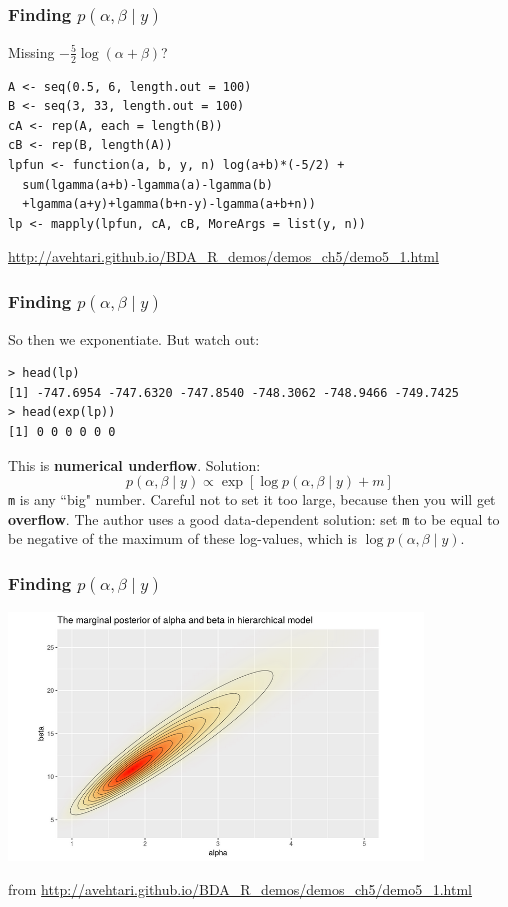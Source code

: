 \documentclass{beamer}
\begin{document}
\begin{frame}[fragile]
\frametitle{Finding $p(\alpha,\beta \mid y)$ }

Missing $- \frac{5}{2} \log (\alpha + \beta)$?
\begin{verbatim}
A <- seq(0.5, 6, length.out = 100)
B <- seq(3, 33, length.out = 100)
cA <- rep(A, each = length(B))
cB <- rep(B, length(A))
lpfun <- function(a, b, y, n) log(a+b)*(-5/2) +
  sum(lgamma(a+b)-lgamma(a)-lgamma(b)
  +lgamma(a+y)+lgamma(b+n-y)-lgamma(a+b+n))
lp <- mapply(lpfun, cA, cB, MoreArgs = list(y, n))
\end{verbatim}


\url{http://avehtari.github.io/BDA_R_demos/demos_ch5/demo5_1.html}

\end{frame}


\begin{frame}[fragile]
\frametitle{Finding $p(\alpha,\beta \mid y)$ }

So then we exponentiate. But watch out: 
\begin{verbatim}
> head(lp)
[1] -747.6954 -747.6320 -747.8540 -748.3062 -748.9466 -749.7425
> head(exp(lp))
[1] 0 0 0 0 0 0
\end{verbatim}
\pause

This is {\bf numerical underflow}. Solution:
\[
p(\alpha, \beta \mid y) \propto \exp[\log p(\alpha, \beta \mid y) + m]
\]
\verb|m| is any ``big" number. Careful not to set it too large, because then you will get {\bf overflow}. The author uses a good data-dependent solution: set \verb|m| to be equal to be negative of the maximum of these log-values, which is $\log p(\alpha, \beta \mid y)$. 

\end{frame}

\begin{frame}[fragile]
\frametitle{Finding $p(\alpha,\beta \mid y)$ }

\begin{center}
\includegraphics[width=110mm]{marg_posterior.png}
\end{center}
from \url{http://avehtari.github.io/BDA_R_demos/demos_ch5/demo5_1.html}
\end{frame}
\end{document}
